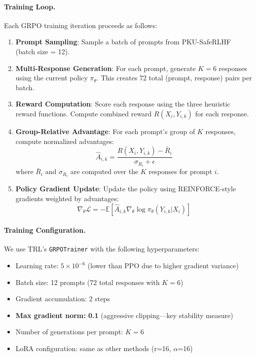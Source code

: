 \paragraph{Training Loop.} Each GRPO training iteration proceeds as follows:

\begin{enumerate}[leftmargin=*]
    \item \textbf{Prompt Sampling}: Sample a batch of prompts from PKU-SafeRLHF (batch size = 12).

    \item \textbf{Multi-Response Generation}: For each prompt, generate $K=6$ responses using the current policy $\pi_\theta$. This creates 72 total (prompt, response) pairs per batch.

    \item \textbf{Reward Computation}: Score each response using the three heuristic reward functions. Compute combined reward $R(X_i, Y_{i,k})$ for each response.

    \item \textbf{Group-Relative Advantage}: For each prompt's group of $K$ responses, compute normalized advantages:
    \begin{equation}
        \hat{A}_{i,k} = \frac{R(X_i, Y_{i,k}) - \bar{R}_i}{\sigma_{R_i} + \epsilon}
    \end{equation}
    where $\bar{R}_i$ and $\sigma_{R_i}$ are computed over the $K$ responses for prompt $i$.

    \item \textbf{Policy Gradient Update}: Update the policy using REINFORCE-style gradients weighted by advantages:
    \begin{equation}
        \nabla_\theta \mathcal{L} = -\mathbb{E}\left[ \hat{A}_{i,k} \nabla_\theta \log \pi_\theta(Y_{i,k} | X_i) \right]
    \end{equation}
\end{enumerate}

\paragraph{Training Configuration.} We use TRL's \texttt{GRPOTrainer} with the following hyperparameters:
\begin{itemize}[leftmargin=*]
    \item Learning rate: $5 \times 10^{-6}$ (lower than PPO due to higher gradient variance)
    \item Batch size: 12 prompts (72 total responses with $K=6$)
    \item Gradient accumulation: 2 steps
    \item \textbf{Max gradient norm: 0.1} (aggressive clipping---key stability measure)
    \item Number of generations per prompt: $K=6$
    \item LoRA configuration: same as other methods (r=16, $\alpha$=16)
\end{itemize}

